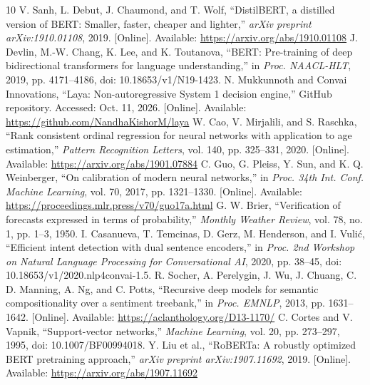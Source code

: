 \documentclass[conference]{IEEEtran}
\begin{document}
\begin{thebibliography}{10}
V. Sanh, L. Debut, J. Chaumond, and T. Wolf, ``DistilBERT, a distilled version of BERT: Smaller, faster, cheaper and lighter,'' \emph{arXiv preprint arXiv:1910.01108}, 2019. [Online]. Available: \url{https://arxiv.org/abs/1910.01108}
J. Devlin, M.-W. Chang, K. Lee, and K. Toutanova, ``BERT: Pre-training of deep bidirectional transformers for language understanding,'' in \emph{Proc. NAACL-HLT}, 2019, pp. 4171--4186, doi: 10.18653/v1/N19-1423.
N. Mukkunnoth and Convai Innovations, ``Laya: Non-autoregressive System 1 decision engine,'' GitHub repository. Accessed: Oct. 11, 2026. [Online]. Available: \url{https://github.com/NandhaKishorM/laya}
W. Cao, V. Mirjalili, and S. Raschka, ``Rank consistent ordinal regression for neural networks with application to age estimation,'' \emph{Pattern Recognition Letters}, vol. 140, pp. 325--331, 2020. [Online]. Available: \url{https://arxiv.org/abs/1901.07884}
C. Guo, G. Pleiss, Y. Sun, and K. Q. Weinberger, ``On calibration of modern neural networks,'' in \emph{Proc. 34th Int. Conf. Machine Learning}, vol. 70, 2017, pp. 1321--1330. [Online]. Available: \url{https://proceedings.mlr.press/v70/guo17a.html}
G. W. Brier, ``Verification of forecasts expressed in terms of probability,'' \emph{Monthly Weather Review}, vol. 78, no. 1, pp. 1--3, 1950.
I. Casanueva, T. Temcinas, D. Gerz, M. Henderson, and I. Vuli\'{c}, ``Efficient intent detection with dual sentence encoders,'' in \emph{Proc. 2nd Workshop on Natural Language Processing for Conversational AI}, 2020, pp. 38--45, doi: 10.18653/v1/2020.nlp4convai-1.5.
R. Socher, A. Perelygin, J. Wu, J. Chuang, C. D. Manning, A. Ng, and C. Potts, ``Recursive deep models for semantic compositionality over a sentiment treebank,'' in \emph{Proc. EMNLP}, 2013, pp. 1631--1642. [Online]. Available: \url{https://aclanthology.org/D13-1170/}
C. Cortes and V. Vapnik, ``Support-vector networks,'' \emph{Machine Learning}, vol. 20, pp. 273--297, 1995, doi: 10.1007/BF00994018.
Y. Liu et al., ``RoBERTa: A robustly optimized BERT pretraining approach,'' \emph{arXiv preprint arXiv:1907.11692}, 2019. [Online]. Available: \url{https://arxiv.org/abs/1907.11692}
\end{thebibliography}
\end{document}
